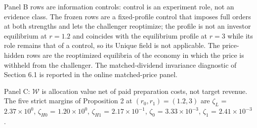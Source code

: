 \begin{threeparttable}
\begin{tablenotes}
\item Panel B rows are information controls: control is an experiment role, not an evidence class. The frozen rows are a fixed-profile control that imposes full orders at both strengths and lets the challenger reoptimize; the profile is not an investor equilibrium at $r=1.2$ and coincides with the equilibrium profile at $r=3$ while its role remains that of a control, so its Unique field is not applicable. The price-hidden rows are the reoptimized equilibria of the economy in which the price is withheld from the challenger. The matched-dividend invariance diagnostic of Section 6.1 is reported in the online matched-price panel.
\item Panel C: $\mathcal{W}$ is allocation value net of paid preparation costs, not target revenue. The five strict margins of Proposition 2 at $(r_0,r_1)=(1.2,3)$ are $\zeta_L$ = $2.37\times10^{0}$, $\zeta_{H0}$ = $1.20\times10^{0}$, $\zeta_{H1}$ = $2.17\times10^{-1}$, $\zeta_0$ = $3.33\times10^{-3}$, $\zeta_1$ = $2.41\times10^{-3}$.
\end{tablenotes}
\end{threeparttable}
